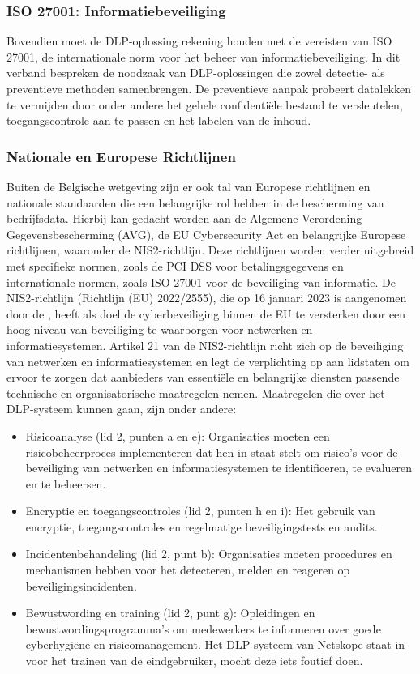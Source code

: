 \subsubsection{ISO 27001: Informatiebeveiliging}%

Bovendien moet de DLP-oplossing rekening houden met de vereisten van ISO 27001, de internationale norm voor het beheer van informatiebeveiliging. 
In dit verband bespreken \textcite{Alsanabani2020} de noodzaak van DLP-oplossingen die zowel detectie- als preventieve methoden samenbrengen. 
De preventieve aanpak probeert datalekken te vermijden door onder andere het gehele confidentiële bestand te versleutelen, toegangscontrole aan te passen en het labelen van de inhoud.

\subsubsection{Nationale en Europese Richtlijnen}%

Buiten de Belgische wetgeving zijn er ook tal van Europese richtlijnen en nationale standaarden die een belangrijke rol hebben in de bescherming van bedrijfsdata. 
Hierbij kan gedacht worden aan de Algemene Verordening Gegevensbescherming (AVG), de EU Cybersecurity Act en belangrijke Europese richtlijnen, waaronder de NIS2-richtlijn. 
Deze richtlijnen worden verder uitgebreid met specifieke normen, zoals de PCI DSS voor betalingsgegevens en internationale normen, zoals ISO 27001 voor de beveiliging van informatie. 
De NIS2-richtlijn (Richtlijn (EU) 2022/2555), die op 16 januari 2023 is aangenomen door de \cite{nis2directive}, heeft als doel de cyberbeveiliging binnen de EU te versterken door een hoog niveau van beveiliging te waarborgen voor netwerken en informatiesystemen. 
Artikel 21 van de NIS2-richtlijn richt zich op de beveiliging van netwerken en informatiesystemen en legt de verplichting op aan lidstaten om ervoor te zorgen dat aanbieders van essentiële en belangrijke diensten passende technische en organisatorische maatregelen nemen. 
Maatregelen die over het DLP-systeem kunnen gaan, zijn onder andere: 

\begin{itemize}
    \item Risicoanalyse (lid 2, punten a en e): Organisaties moeten een risicobeheerproces implementeren dat hen in staat stelt om risico's voor de beveiliging van netwerken en informatiesystemen te identificeren, te evalueren en te beheersen.
    \item Encryptie en toegangscontroles (lid 2, punten h en i): Het gebruik van encryptie, toegangscontroles en regelmatige beveiligingstests en audits.
    \item Incidentenbehandeling (lid 2, punt b): Organisaties moeten procedures en mechanismen hebben voor het detecteren, melden en reageren op beveiligingsincidenten.
    \item Bewustwording en training (lid 2, punt g): Opleidingen en bewustwordingsprogramma's om medewerkers te informeren over goede cyberhygiëne en risicomanagement. \autocite{nis2directive} Het DLP-systeem van Netskope staat in voor het trainen van de eindgebruiker, mocht deze iets foutief doen.
\end{itemize}

